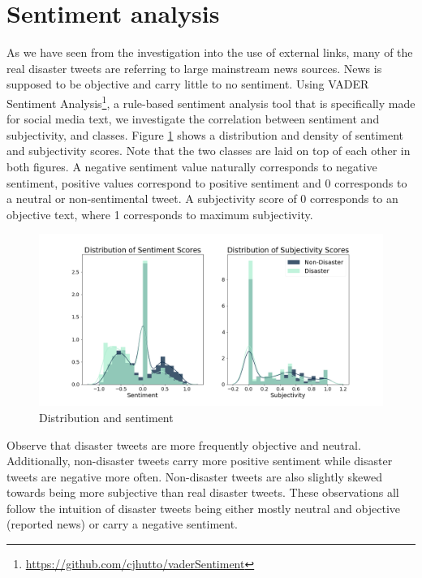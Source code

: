 \documentclass[journal, ]{IEEEtran}
\let\MYoriglatexcaption\caption
\renewcommand{\caption}[2][\relax]{\MYoriglatexcaption[#2]{#2}}
\begin{document}
\section{Sentiment analysis}
As we have seen from the investigation into the use of external links, many of
the real disaster tweets are referring to large mainstream news sources. News
is supposed to be objective and carry little to no sentiment. Using VADER
Sentiment Analysis\footnote{\url{https://github.com/cjhutto/vaderSentiment}}, a
rule-based sentiment analysis tool that is specifically made for social media
text, we investigate the correlation between sentiment and subjectivity, and
classes. Figure \ref{fig:sent_sub_dist} shows a distribution and density of
sentiment and subjectivity scores. Note that the two classes are laid on top of
each other in both figures. A negative sentiment value naturally corresponds to
negative sentiment, positive values correspond to positive sentiment and 0
corresponds to a neutral or non-sentimental tweet. A subjectivity score of 0
corresponds to an objective text, where 1 corresponds to maximum subjectivity.

\begin{figure}[hbt!]
  \centering
  \includegraphics[width=\linewidth]{../figures/sent_sub_dist.png}
  \caption{Distribution and sentiment }
  \label{fig:sent_sub_dist}
\end{figure}

Observe that disaster tweets are more frequently objective and neutral.
Additionally, non-disaster tweets carry more positive sentiment while disaster
tweets are negative more often. Non-disaster tweets are also slightly skewed
towards being more subjective than real disaster tweets. These observations all
follow the intuition of disaster tweets being either mostly neutral and
objective (reported news) or carry a negative sentiment. 
\end{document}
